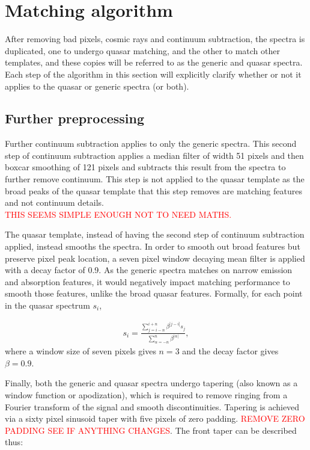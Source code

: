 \documentclass[titlesmallcaps, examinerscopy, copyrightpage]{uqthesis}
\newcommand\abs[1]{\left|#1\right|}
\begin{document}
\section{Matching algorithm}

After removing bad pixels, cosmic rays and continuum subtraction, the spectra is duplicated, one to undergo quasar matching, and the other to match other templates, and these copies will be referred to as the generic and quasar spectra. Each step of the algorithm in this section will explicitly clarify whether or not it applies to the quasar or generic spectra (or both).

\subsection{Further preprocessing}

Further continuum subtraction applies to only the generic spectra. This second step of continuum subtraction applies a median filter of width 51 pixels and then boxcar smoothing of 121 pixels and subtracts this result from the spectra to further remove continuum. This step is not applied to the quasar template as the broad peaks of the quasar template that this step removes are matching features and not continuum details.\\

\textcolor{red}{THIS SEEMS SIMPLE ENOUGH NOT TO NEED MATHS.}



The quasar template, instead of having the second step of continuum subtraction applied, instead smooths the spectra. In order to smooth out broad features but preserve pixel peak location, a seven pixel window  decaying mean filter is applied with a decay factor of 0.9. As the generic spectra matches on narrow emission and absorption features, it would negatively impact matching performance to smooth those features, unlike the broad quasar features. Formally, for each point in the quasar spectrum $s_i$, 

\begin{align}
s_i = \frac{\sum\limits_{j = i -n}^{i+n} \beta^{\abs{j-i}} s_j}{\sum\limits_{\alpha=-n}^n \beta^{\abs{\alpha}}},
\end{align}
where a window size of seven pixels gives $n=3$ and the decay factor gives $\beta = 0.9$.


Finally, both the generic and quasar spectra undergo tapering (also known as a window function or apodization), which is required to remove ringing from a Fourier transform of the signal and smooth discontinuities. Tapering is achieved via a sixty pixel sinusoid taper with five pixels of zero padding. \textcolor{red}{REMOVE ZERO PADDING SEE IF ANYTHING CHANGES}. The front taper can be described thus:
\end{document}
